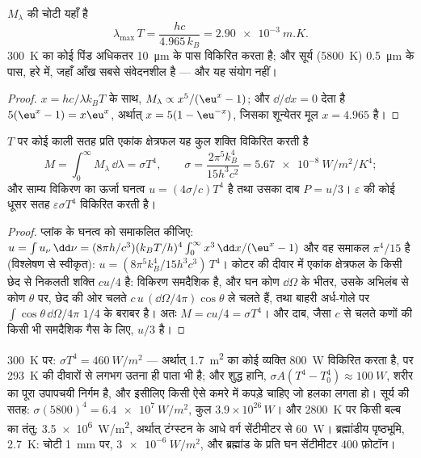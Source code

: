 \begin{proposition}[वीन का विस्थापन नियम]\label{prop:b2:thermal-radiation:wien}
 $M_\lambda$ की चोटी यहाँ है
\[
\lambda_{\max}\,T = \frac{hc}{4.965\,k_B} = \qty{2.90e-3}{m.K} .
\]
\qty{300}{K} का कोई पिंड अधिकतर \qty{10}{\micro m} के पास विकिरित करता है; और सूर्य
(\qty{5800}{K}) \qty{0.5}{\micro m} के पास, हरे में, जहाँ आँख सबसे
संवेदनशील है --- और यह संयोग नहीं।
\end{proposition}

\begin{proof}
$x = hc/\lambda k_BT$ के साथ, $M_\lambda \propto x^5/(\eu^x - 1)$; और $\dd/\dd x = 0$
देता है $5(\eu^x - 1) = x\eu^x$, अर्थात् $x = 5(1 - \eu^{-x})$, जिसका शून्येतर
मूल $x = 4.965$ है।
\end{proof}

\begin{theorem}[श्टेफ़ान--बोल्ट्समान नियम]\label{thm:b2:thermal-radiation:stefan}
$T$ पर कोई काली सतह प्रति एकांक क्षेत्रफल यह कुल शक्ति विकिरित करती है
\[
M = \int_0^\infty M_\lambda\,\dd\lambda = \sigma T^4, \qquad
\sigma = \frac{2\pi^5k_B^4}{15h^3c^2} = \qty{5.67e-8}{W/m^2/K^4} ;
\]
और साम्य विकिरण का ऊर्जा घनत्व $u = (4\sigma/c)T^4$ है
तथा उसका दाब $P = u/3$।  $\varepsilon$ की कोई धूसर सतह
$\varepsilon\sigma T^4$ विकिरित करती है।
\end{theorem}

\begin{proof}
प्लांक के घनत्व को समाकलित कीजिए: $u = \int u_\nu\,\dd\nu = (8\pi h/c^3)(k_BT/h)^4
\int_0^\infty x^3\,\dd x/(\eu^x - 1)$ और वह समाकल $\pi^4/15$ है
(विश्लेषण से स्वीकृत): $u = (8\pi^5k_B^4/15h^3c^3)\,T^4$। कोटर की दीवार में
एकांक क्षेत्रफल के किसी छेद से निकलती शक्ति $cu/4$ है:
विकिरण समदैशिक है, और घन कोण $\dd\Omega$ के भीतर, उसके अभिलंब से कोण
$\theta$ पर, छेद की ओर चलते  $c\,u\,(\dd\Omega/4\pi)\cos\theta$ ले चलते हैं, तथा बाहरी अर्ध-गोले पर $\int\cos\theta\,\dd\Omega/4\pi$
$1/4$ के बराबर है। अतः $M = cu/4 = \sigma T^4$।
और दाब, जैसा $c$ से चलते कणों की किसी भी समदैशिक गैस के लिए,
$u/3$ है।
\end{proof}

\begin{example}[कोटियाँ]\label{ex:b2:thermal-radiation:orders}
\qty{300}{K} पर: $\sigma T^4 = \qty{460}{W/m^2}$ --- अर्थात्
\qty{1.7}{m^2} का कोई व्यक्ति \qty{800}{W} विकिरित करता है, पर \qty{293}{K} की
दीवारों से लगभग उतना ही पाता भी है; और शुद्ध हानि, $\sigma A(T^4 - T_0^4) \approx
\qty{100}{W}$, शरीर का पूरा उपापचयी निर्गम है, और इसीलिए किसी ऐसे कमरे में
कपड़े चाहिए जो हलका लगता हो। सूर्य की सतह: $\sigma
(5800)^4 = \qty{6.4e7}{W/m^2}$, कुल $3.9 \times 10^{26}\,\unit{W}$। और
\qty{2800}{K} पर किसी बल्ब का तंतु: \qty{3.5e6}{W/m^2}, अर्थात् टंग्स्टन के आधे
वर्ग सेंटीमीटर से \qty{60}{W}। ब्रह्मांडीय पृष्ठभूमि, \qty{2.7}{K}:
चोटी \qty{1}{mm} पर, $\qty{3e-6}{W/m^2}$, और ब्रह्मांड के प्रति घन
सेंटीमीटर $400$ फ़ोटॉन।
\end{example}

